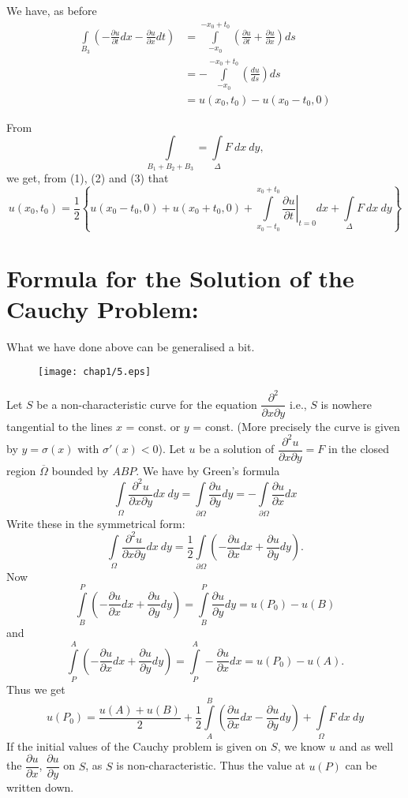 \begin{coro*}
\begin{enumerate}
We have, as before
\begin{align*}
\int\limits_{B_{3}}\left(-\frac{\partial u}{\partial t}dx-\frac{\partial u}{\partial x}dt\right) &= \int\limits^{-x_{0}+t_{0}}_{-x_{0}}\left(\frac{\partial u}{\partial t}+\frac{\partial u}{\partial x}\right)ds\\[4pt]
&= -\int\limits^{-x_{0}+t_{0}}_{-x_{0}}\left(\frac{du}{ds}\right)ds\\[4pt]
&= u(x_{0},t_{0})-u(x_{0}-t_{0},0)
\end{align*}
\end{enumerate}

From\pageoriginale
$$
\int\limits_{B_{1}+B_{2}+B_{3}}=\int\limits_{\Delta}F \ dx \ dy,
$$
we get, from (1), (2) and (3) that
$$
u(x_{0},t_{0})=\frac{1}{2}\left\{u(x_{0}-t_{0},0)+u(x_{0}+t_{0},0)+\int\limits^{x_{0}+t_{0}}_{x_{0}-t_{0}}\left.\frac{\partial u}{\partial t}\right|_{t=0}dx+\int\limits_{\Delta} F \ dx \ dy\right\}
$$
\end{coro*}

\section*{Formula for the Solution of the Cauchy Problem:}\pageoriginale

What we have done above can be generalised a bit.
\begin{figure}[H]
\centering
\texttt{[image: chap1/5.eps]}
\end{figure}

Let $S$ be a non-characteristic curve for the equation $\dfrac{\partial^{2}}{\partial x \partial y}$ i.e., $S$ is nowhere tangential to the lines $x$ = const. or $y$ = const. (More precisely the curve is given by $y=\sigma(x)$ with $\sigma'(x)<0$). Let $u$ be a solution of $\dfrac{\partial^{2}u}{\partial x\partial y}=F$ in the closed region $\overline{\Omega}$ bounded by $ABP$. We have by Green's formula
$$
\int\limits_{\Omega}\frac{\partial^{2}u}{\partial x\partial y}dx \ dy =\int\limits_{\partial\Omega}\frac{\partial u}{\partial y}dy=-\int\limits_{\partial \Omega}\frac{\partial u}{\partial x}dx
$$
Write these in the symmetrical form:
$$
\int\limits_{\Omega}\frac{\partial^{2}u}{\partial x\partial y}dx \ dy =\frac{1}{2}\int\limits_{\partial \Omega}\left(-\frac{\partial u}{\partial x}dx+\frac{\partial u}{\partial y}dy\right).
$$
Now
$$
\int\limits^{P}_{B}\left(-\frac{\partial u}{\partial x}dx+\frac{\partial u}{\partial y}dy\right)=\int\limits^{P}_{B}\frac{\partial u}{\partial y}dy=u(P_{0})-u(B)
$$
and
$$
\int\limits^{A}_{P}\left(-\frac{\partial u}{\partial x}dx+\frac{\partial u}{\partial y}dy\right)=\int\limits^{A}_{P}-\frac{\partial u}{\partial x}dx=u(P_{0})-u(A).
$$
Thus we get
$$
u(P_{0})=\frac{u(A)+u(B)}{2}+\frac{1}{2}\int\limits^{B}_{A}\left(\frac{\partial u}{\partial x}dx-\frac{\partial u}{\partial y}dy\right)+\int\limits_{\Omega}F \ dx \ dy
$$
If the initial values of the Cauchy problem is given on $S$, we know $u$ and as well the $\dfrac{\partial u}{\partial x}$, $\dfrac{\partial u}{\partial y}$ on $S$, as $S$ is non-characteristic. Thus the value at $u(P)$ can be written down.


